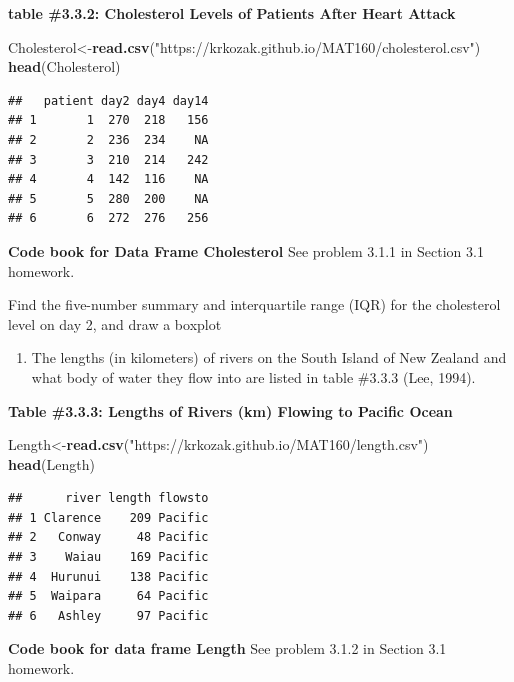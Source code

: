 \documentclass[]{book}
\newenvironment{Shaded}{\begin{snugshade}}{\end{snugshade}}
\newcommand{\KeywordTok}[1]{\textcolor[rgb]{0.13,0.29,0.53}{\textbf{#1}}}
\newcommand{\NormalTok}[1]{#1}
\newcommand{\StringTok}[1]{\textcolor[rgb]{0.31,0.60,0.02}{#1}}
\providecommand{\tightlist}{%
  \setlength{\itemsep}{0pt}\setlength{\parskip}{0pt}}
\begin{document}
\textbf{table \#3.3.2: Cholesterol Levels of Patients After Heart Attack}

\begin{Shaded}
\begin{Highlighting}[]
\NormalTok{Cholesterol<-}\KeywordTok{read.csv}\NormalTok{(}\StringTok{"https://krkozak.github.io/MAT160/cholesterol.csv"}\NormalTok{)}
\KeywordTok{head}\NormalTok{(Cholesterol)}
\end{Highlighting}
\end{Shaded}

\begin{verbatim}
##   patient day2 day4 day14
## 1       1  270  218   156
## 2       2  236  234    NA
## 3       3  210  214   242
## 4       4  142  116    NA
## 5       5  280  200    NA
## 6       6  272  276   256
\end{verbatim}

\textbf{Code book for Data Frame Cholesterol} See problem 3.1.1 in Section 3.1 homework.

Find the five-number summary and interquartile range (IQR) for the cholesterol level on day 2, and draw a boxplot

\begin{enumerate}
\def\labelenumi{\arabic{enumi}.}
\setcounter{enumi}{5}
\tightlist
\item
  The lengths (in kilometers) of rivers on the South Island of New Zealand and what body of water they flow into are listed in table \#3.3.3 (Lee, 1994).
\end{enumerate}

\textbf{Table \#3.3.3: Lengths of Rivers (km) Flowing to Pacific Ocean}

\begin{Shaded}
\begin{Highlighting}[]
\NormalTok{Length<-}\KeywordTok{read.csv}\NormalTok{(}\StringTok{"https://krkozak.github.io/MAT160/length.csv"}\NormalTok{)}
\KeywordTok{head}\NormalTok{(Length)}
\end{Highlighting}
\end{Shaded}

\begin{verbatim}
##      river length flowsto
## 1 Clarence    209 Pacific
## 2   Conway     48 Pacific
## 3    Waiau    169 Pacific
## 4  Hurunui    138 Pacific
## 5  Waipara     64 Pacific
## 6   Ashley     97 Pacific
\end{verbatim}

\textbf{Code book for data frame Length} See problem 3.1.2 in Section 3.1 homework.
\end{document}
